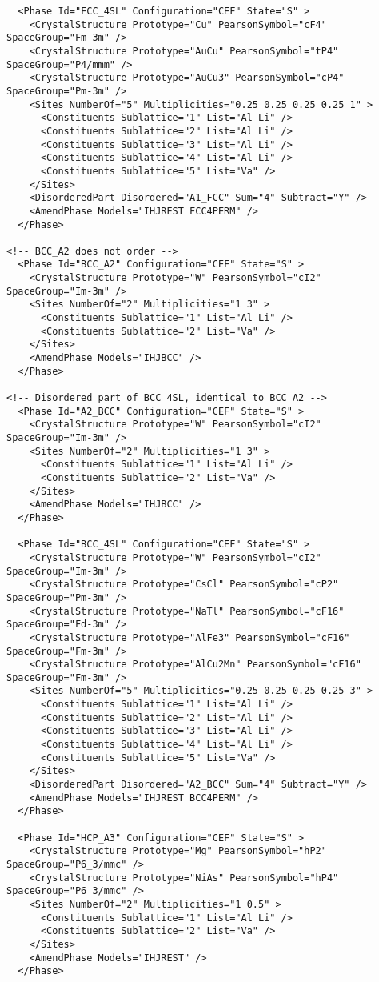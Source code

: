 \documentclass{article}
\begin{document}
\begin{appendices}
\begin{verbatim}
  <Phase Id="FCC_4SL" Configuration="CEF" State="S" >
	<CrystalStructure Prototype="Cu" PearsonSymbol="cF4" SpaceGroup="Fm-3m" />
	<CrystalStructure Prototype="AuCu" PearsonSymbol="tP4" SpaceGroup="P4/mmm" />
	<CrystalStructure Prototype="AuCu3" PearsonSymbol="cP4" SpaceGroup="Pm-3m" />
    <Sites NumberOf="5" Multiplicities="0.25 0.25 0.25 0.25 1" >
      <Constituents Sublattice="1" List="Al Li" />
      <Constituents Sublattice="2" List="Al Li" />
      <Constituents Sublattice="3" List="Al Li" />
      <Constituents Sublattice="4" List="Al Li" />
      <Constituents Sublattice="5" List="Va" />
    </Sites>
    <DisorderedPart Disordered="A1_FCC" Sum="4" Subtract="Y" />
    <AmendPhase Models="IHJREST FCC4PERM" />
  </Phase>

<!-- BCC_A2 does not order -->
  <Phase Id="BCC_A2" Configuration="CEF" State="S" >
	<CrystalStructure Prototype="W" PearsonSymbol="cI2" SpaceGroup="Im-3m" />
    <Sites NumberOf="2" Multiplicities="1 3" >
      <Constituents Sublattice="1" List="Al Li" />
      <Constituents Sublattice="2" List="Va" />
    </Sites>
    <AmendPhase Models="IHJBCC" />
  </Phase>

<!-- Disordered part of BCC_4SL, identical to BCC_A2 -->
  <Phase Id="A2_BCC" Configuration="CEF" State="S" >
	<CrystalStructure Prototype="W" PearsonSymbol="cI2" SpaceGroup="Im-3m" />
    <Sites NumberOf="2" Multiplicities="1 3" >
      <Constituents Sublattice="1" List="Al Li" />
      <Constituents Sublattice="2" List="Va" />
    </Sites>
    <AmendPhase Models="IHJBCC" />
  </Phase>

  <Phase Id="BCC_4SL" Configuration="CEF" State="S" >
	<CrystalStructure Prototype="W" PearsonSymbol="cI2" SpaceGroup="Im-3m" />
	<CrystalStructure Prototype="CsCl" PearsonSymbol="cP2" SpaceGroup="Pm-3m" />
	<CrystalStructure Prototype="NaTl" PearsonSymbol="cF16" SpaceGroup="Fd-3m" />
	<CrystalStructure Prototype="AlFe3" PearsonSymbol="cF16" SpaceGroup="Fm-3m" />
	<CrystalStructure Prototype="AlCu2Mn" PearsonSymbol="cF16" SpaceGroup="Fm-3m" />
    <Sites NumberOf="5" Multiplicities="0.25 0.25 0.25 0.25 3" >
      <Constituents Sublattice="1" List="Al Li" />
      <Constituents Sublattice="2" List="Al Li" />
      <Constituents Sublattice="3" List="Al Li" />
      <Constituents Sublattice="4" List="Al Li" />
      <Constituents Sublattice="5" List="Va" />
    </Sites>
    <DisorderedPart Disordered="A2_BCC" Sum="4" Subtract="Y" />
    <AmendPhase Models="IHJREST BCC4PERM" />
  </Phase>

  <Phase Id="HCP_A3" Configuration="CEF" State="S" >
	<CrystalStructure Prototype="Mg" PearsonSymbol="hP2" SpaceGroup="P6_3/mmc" />
	<CrystalStructure Prototype="NiAs" PearsonSymbol="hP4" SpaceGroup="P6_3/mmc" />
    <Sites NumberOf="2" Multiplicities="1 0.5" >
      <Constituents Sublattice="1" List="Al Li" />
      <Constituents Sublattice="2" List="Va" />
    </Sites>
    <AmendPhase Models="IHJREST" />
  </Phase>


\end{verbatim}
\end{appendices}
\end{document}
